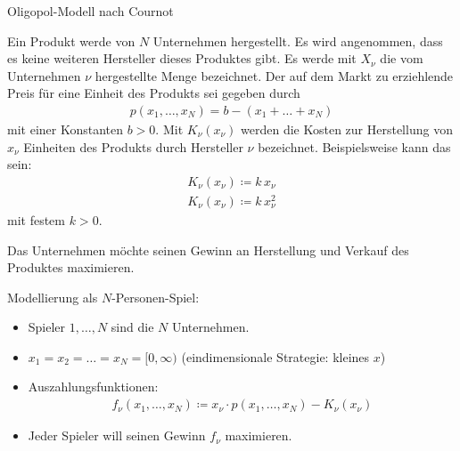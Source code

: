 \begin{beispiel} Oligopol-Modell nach Cournot
  
Ein Produkt werde von $N$ Unternehmen hergestellt. Es wird angenommen, dass es keine weiteren Hersteller dieses Produktes gibt. Es werde mit $X_{\nu}$ die vom Unternehmen $\nu$ hergestellte Menge bezeichnet. Der auf dem Markt zu erziehlende Preis für eine Einheit des Produkts sei gegeben durch
\begin{align*}
  p(x_{1}, \dots, x_{N}) = b-(x_{1} + \dots + x_{N})
\end{align*}
mit einer Konstanten $b > 0$. Mit $K_{\nu}(x_{\nu})$ werden die Kosten zur Herstellung von $x_{\nu}$ Einheiten des Produkts durch Hersteller $\nu$ bezeichnet. Beispielsweise kann das sein:
\begin{align*}
  K_{\nu}(x_{\nu}) \coloneqq k \, x_{\nu} \\
  K_{\nu}(x_{\nu}) \coloneqq k \, x_{\nu}^{2}
\end{align*}
mit festem $k > 0$. 

Das Unternehmen möchte seinen Gewinn an Herstellung und Verkauf des Produktes maximieren. 

Modellierung als $N$-Personen-Spiel: 
\begin{itemize}
\item Spieler $1, \dots, N$ sind die $N$ Unternehmen. 
\item $x_{1} = x_{2} = \dots = x_{N} = [0, \infty)$ (eindimensionale Strategie: kleines $x$)
\item Auszahlungsfunktionen:
  \begin{align*}
    f_{\nu}(x_{1}, \dots, x_{N}) \coloneqq x_{\nu}\cdot p(x_{1}, \dots, x_{N}) - K_{\nu}(x_{\nu})
  \end{align*}
\item Jeder Spieler will seinen Gewinn $f_{\nu}$ maximieren. 
\end{itemize}
\end{beispiel}
